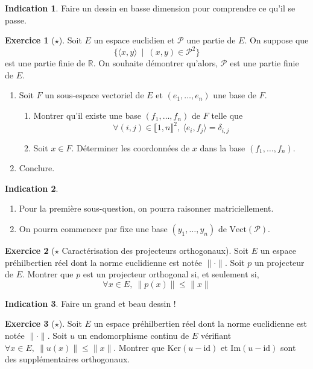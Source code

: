 \documentclass[french]{book}
\newcommand{\R}{\mathbb{R}}
\renewcommand{\ker}{\text{Ker}}
\newcommand{\im}{\text{Im}}
\newcommand{\id}{\text{id}}
\theoremstyle{definition}
\newtheorem{ex}{Exercice}[chapter]
\theoremstyle{theorem}
\newtheorem*{ind}{Indication}
\theoremstyle{remark}
\begin{document}
\begin{ind}
	Faire un dessin en basse dimension pour comprendre ce qu'il se passe.
\end{ind}

\begin{ex}[$\star$]
	Soit $E$ un espace euclidien et $\mathcal{P}$ une partie de $E$. On suppose que $$\{\langle x,y\rangle\ \mid\ (x,y)\in\mathcal{P}^2\}$$ est une partie finie de $\R$. On souhaite démontrer qu'alors, $\mathcal{P}$ est une partie finie de $E$.
	\begin{enumerate}
		\item Soit $F$ un sous-espace vectoriel de $E$ et $(e_1,\ldots,e_n)$ une base de $F$.
		\begin{enumerate}
			\item Montrer qu'il existe une base $(f_1,\ldots,f_n)$ de $F$ telle que $$\forall (i,j)\in\llbracket1,n\rrbracket^2,\ \langle e_i,f_j\rangle=\delta_{i,j}$$
			\item Soit $x\in F$. Déterminer les coordonnées de $x$ dans la base $(f_1,\ldots,f_n)$.
		\end{enumerate}
		\item Conclure.
	\end{enumerate}
\end{ex}

\begin{ind}
	\begin{enumerate}
		\item Pour la première sous-question, on pourra raisonner matriciellement.
		\item On pourra commencer par fixe une base $(y_1,\ldots,y_n)$ de $\text{Vect}(\mathcal{P})$.
	\end{enumerate}
\end{ind}

\begin{ex}[$\star$ Caractérisation des projecteurs orthogonaux]
	Soit $E$ un espace préhilbertien réel dont la norme euclidienne est notée $\lVert\cdot\rVert$. Soit $p$ un projecteur de $E$. Montrer que $p$ est un projecteur orthogonal si, et seulement si, $$\forall x\in E,\ \lVert p(x)\rVert\leqslant\lVert x\rVert$$
\end{ex}

\begin{ind}
	Faire un grand et beau dessin !
\end{ind}

\begin{ex}[$\star$]
	Soit $E$ un espace préhilbertien réel dont la norme euclidienne est notée $\lVert\cdot\rVert$. Soit $u$ un endomorphisme continu de $E$ vérifiant $\forall x\in E,\ \lVert u(x)\rVert\leqslant\lVert x\rVert$. Montrer que $\ker(u-\id)$ et $\im(u-\id)$ sont des supplémentaires orthogonaux.
\end{ex}
\end{document}
